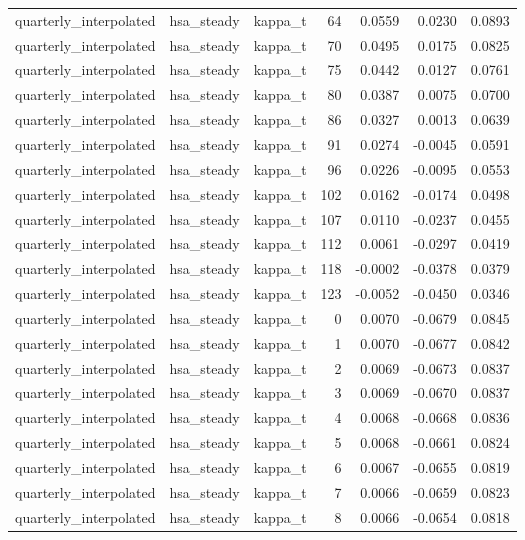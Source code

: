 \begin{tabular}{lllrrrr}
quarterly\_interpolated & hsa\_steady & kappa\_t & 64 & 0.0559 & 0.0230 & 0.0893 \\
quarterly\_interpolated & hsa\_steady & kappa\_t & 70 & 0.0495 & 0.0175 & 0.0825 \\
quarterly\_interpolated & hsa\_steady & kappa\_t & 75 & 0.0442 & 0.0127 & 0.0761 \\
quarterly\_interpolated & hsa\_steady & kappa\_t & 80 & 0.0387 & 0.0075 & 0.0700 \\
quarterly\_interpolated & hsa\_steady & kappa\_t & 86 & 0.0327 & 0.0013 & 0.0639 \\
quarterly\_interpolated & hsa\_steady & kappa\_t & 91 & 0.0274 & -0.0045 & 0.0591 \\
quarterly\_interpolated & hsa\_steady & kappa\_t & 96 & 0.0226 & -0.0095 & 0.0553 \\
quarterly\_interpolated & hsa\_steady & kappa\_t & 102 & 0.0162 & -0.0174 & 0.0498 \\
quarterly\_interpolated & hsa\_steady & kappa\_t & 107 & 0.0110 & -0.0237 & 0.0455 \\
quarterly\_interpolated & hsa\_steady & kappa\_t & 112 & 0.0061 & -0.0297 & 0.0419 \\
quarterly\_interpolated & hsa\_steady & kappa\_t & 118 & -0.0002 & -0.0378 & 0.0379 \\
quarterly\_interpolated & hsa\_steady & kappa\_t & 123 & -0.0052 & -0.0450 & 0.0346 \\
quarterly\_interpolated & hsa\_steady & kappa\_t & 0 & 0.0070 & -0.0679 & 0.0845 \\
quarterly\_interpolated & hsa\_steady & kappa\_t & 1 & 0.0070 & -0.0677 & 0.0842 \\
quarterly\_interpolated & hsa\_steady & kappa\_t & 2 & 0.0069 & -0.0673 & 0.0837 \\
quarterly\_interpolated & hsa\_steady & kappa\_t & 3 & 0.0069 & -0.0670 & 0.0837 \\
quarterly\_interpolated & hsa\_steady & kappa\_t & 4 & 0.0068 & -0.0668 & 0.0836 \\
quarterly\_interpolated & hsa\_steady & kappa\_t & 5 & 0.0068 & -0.0661 & 0.0824 \\
quarterly\_interpolated & hsa\_steady & kappa\_t & 6 & 0.0067 & -0.0655 & 0.0819 \\
quarterly\_interpolated & hsa\_steady & kappa\_t & 7 & 0.0066 & -0.0659 & 0.0823 \\
quarterly\_interpolated & hsa\_steady & kappa\_t & 8 & 0.0066 & -0.0654 & 0.0818 \\

\end{tabular}
